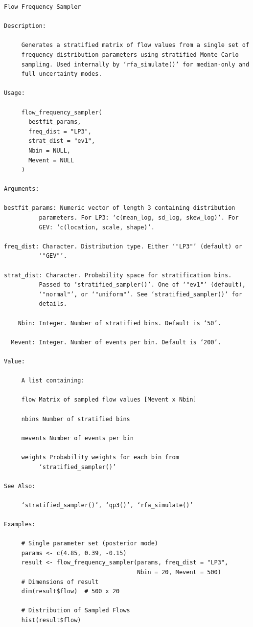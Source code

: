 \documentclass[
  letterpaper,
  DIV=11,
  numbers=noendperiod]{scrreprt}
\begin{document}
\begin{verbatim}
Flow Frequency Sampler

Description:

     Generates a stratified matrix of flow values from a single set of
     frequency distribution parameters using stratified Monte Carlo
     sampling. Used internally by ‘rfa_simulate()’ for median-only and
     full uncertainty modes.

Usage:

     flow_frequency_sampler(
       bestfit_params,
       freq_dist = "LP3",
       strat_dist = "ev1",
       Nbin = NULL,
       Mevent = NULL
     )
     
Arguments:

bestfit_params: Numeric vector of length 3 containing distribution
          parameters. For LP3: ‘c(mean_log, sd_log, skew_log)’. For
          GEV: ‘c(location, scale, shape)’.

freq_dist: Character. Distribution type. Either ‘"LP3"’ (default) or
          ‘"GEV"’.

strat_dist: Character. Probability space for stratification bins.
          Passed to ‘stratified_sampler()’. One of ‘"ev1"’ (default),
          ‘"normal"’, or ‘"uniform"’. See ‘stratified_sampler()’ for
          details.

    Nbin: Integer. Number of stratified bins. Default is ‘50’.

  Mevent: Integer. Number of events per bin. Default is ‘200’.

Value:

     A list containing:

     flow Matrix of sampled flow values [Mevent x Nbin]

     nbins Number of stratified bins

     mevents Number of events per bin

     weights Probability weights for each bin from
          ‘stratified_sampler()’

See Also:

     ‘stratified_sampler()’, ‘qp3()’, ‘rfa_simulate()’

Examples:

     # Single parameter set (posterior mode)
     params <- c(4.85, 0.39, -0.15)
     result <- flow_frequency_sampler(params, freq_dist = "LP3",
                                      Nbin = 20, Mevent = 500)
     # Dimensions of result
     dim(result$flow)  # 500 x 20
     
     # Distribution of Sampled Flows
     hist(result$flow)
     
\end{verbatim}
\end{document}
